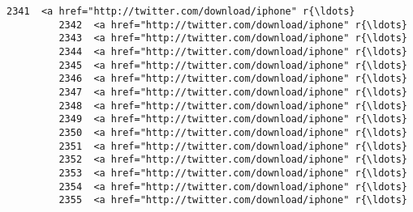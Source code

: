 \documentclass[11pt]{article}
\begin{document}
\begin{Verbatim}[commandchars=\\\{\}]
         2341  <a href="http://twitter.com/download/iphone" r{\ldots}   
         2342  <a href="http://twitter.com/download/iphone" r{\ldots}   
         2343  <a href="http://twitter.com/download/iphone" r{\ldots}   
         2344  <a href="http://twitter.com/download/iphone" r{\ldots}   
         2345  <a href="http://twitter.com/download/iphone" r{\ldots}   
         2346  <a href="http://twitter.com/download/iphone" r{\ldots}   
         2347  <a href="http://twitter.com/download/iphone" r{\ldots}   
         2348  <a href="http://twitter.com/download/iphone" r{\ldots}   
         2349  <a href="http://twitter.com/download/iphone" r{\ldots}   
         2350  <a href="http://twitter.com/download/iphone" r{\ldots}   
         2351  <a href="http://twitter.com/download/iphone" r{\ldots}   
         2352  <a href="http://twitter.com/download/iphone" r{\ldots}   
         2353  <a href="http://twitter.com/download/iphone" r{\ldots}   
         2354  <a href="http://twitter.com/download/iphone" r{\ldots}   
         2355  <a href="http://twitter.com/download/iphone" r{\ldots}   
         

\end{Verbatim}
\end{document}
